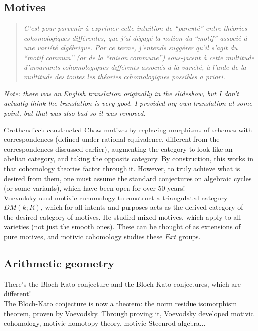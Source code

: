 \documentclass[leqno, openany]{memoir}
\theoremstyle{definition}
\theoremstyle{remark}
\theoremstyle{plain}
\theoremstyle{definition}
\theoremstyle{remark}
\begin{document}
    \subsection{Motives} \begin{quotation} \textit{C'est pour parvenir \`a
        exprimer cette intuition de ``parent\'e'' entre th\'eories
    cohomologiques diff\'erentes, que j'ai d\'egag\'e la notion du ``motif''
associ\'e \`a une vari\'et\'e alg\'ebrique. Par ce terme, j'entends sugg\'erer
qu'il s'agit du ``motif commun'' (or de la ``raison commune'') sous-jacent \`a
cette multitude d'invariants cohomologiques diff\'erents associ\'es \`a l\`a
vari\'et\'e, \`a l'aide de la multitude des toutes les th\'eories
cohomologiques possibles a priori.}
\end{quotation} \textit{Note: there was an English translation originally in
the slideshow, but I don't actually think the translation is very good. I
provided my own translation at some point, but that was also bad so it was
removed.} 

Grothendieck constructed Chow motives by replacing morphisms of schemes with
correspondences (defined under rational equivalence, different from the
correspondences discussed earlier), augmenting the category to look like an
abelian category, and taking the opposite category.  By construction, this
works in that cohomology theories factor through it.  However, to truly achieve
what is desired from them, one must assume the standard conjectures on
algebraic cycles (or some variants), which have been open for over 50 years! \\ 

Voevodsky used motivic cohomology to construct a triangulated category $DM(k;
R)$, which for all intents and purposes acts as the derived category of the
desired category of motives.  He studied mixed motives, which apply to all
varieties (not just the smooth ones).  These can be thought of as extensions of
pure motives, and motivic cohomology studies these $Ext$ groups.  

\subsection{Arithmetic geometry} There's the Bloch-Kato conjecture and the
Bloch-Kato conjectures, which are different! \\ 

The Bloch-Kato conjecture is now a theorem: the norm residue isomorphism
theorem, proven by Voevodsky.  Through proving it, Voevodsky developed motivic
cohomology, motivic homotopy theory, motivic Steenrod algebra... \\
\end{document}
